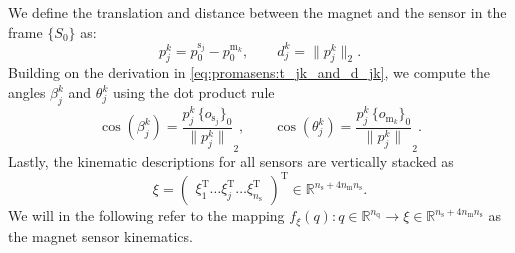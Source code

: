 We define the translation and distance between the magnet and the sensor in the frame $\{S_{0}\}$ as:
\begin{equation}\label{eq:promasens:t_jk_and_d_jk}
    p_j^{k} = p_{0}^{\mathrm{s}_j} - p_{0}^{\mathrm{m}_k}, \qquad  d_j^k = \lVert p_{j}^{k} \rVert_2.
\end{equation}
Building on the derivation in \eqref{eq:promasens:t_jk_and_d_jk}, we compute the angles $\beta_j^k$ and $\theta_j^k$ using the dot product rule
\begin{equation}\label{eq:promasens:theta_jk_and_beta_jk}
    \cos (\beta_j^k) = \frac{p_j^{k} \, \{ o_{\mathrm{s}_j} \}_{0}}{\lVert p_j^{k} \rVert}_2,
    \qquad
    \cos (\theta_j^k) = \frac{p_j^{k} \, \{ o_{\mathrm{m}_k} \}_{0}}{\lVert p_j^{k} \rVert}_2.
\end{equation}
Lastly, the kinematic descriptions for all sensors are vertically stacked as
\begin{equation}
    \xi = \begin{pmatrix} \xi_1^\mathrm{T} \dots \xi_j^\mathrm{T} \dots \xi_{n_\mathrm{s}}^\mathrm{T} \end{pmatrix}^\mathrm{T} \in \mathbb{R}^{n_\mathrm{s} + 4n_\mathrm{m} n_\mathrm{s}}.
\end{equation}
We will in the following refer to the mapping $f_\xi(q): q \in \mathbb{R}^{n_\mathrm{q}}
\rightarrow \xi \in \mathbb{R}^{n_\mathrm{s} + 4n_\mathrm{m} n_\mathrm{s}}$ as the magnet sensor kinematics.


